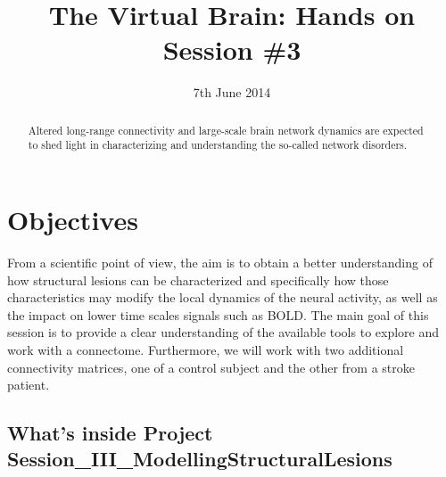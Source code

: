 \documentclass{tufte-handout}
\title{The Virtual Brain: Hands on Session \#3}
\date{7th June 2014}
\begin{document}

\newpage
\ClearWallPaper
\begin{abstract}
\noindent  Altered long-range connectivity and large-scale brain network dynamics are expected to shed light in characterizing and understanding the so-called network disorders. 
\begin{marginfigure}%
  \label{fig:marginfig}
\end{marginfigure}
\end{abstract}


\section{Objectives}\label{sec:objectives}

From a scientific point of view, the aim is to obtain a better understanding of
how structural lesions can be characterized and specifically how those
characteristics may modify the local dynamics of the neural activity, as well
as the impact on lower time scales signals such as BOLD. The main goal of this
session is to provide a clear understanding of the available tools to explore
and work with a connectome. Furthermore, we will work with two additional
connectivity matrices, one of a control subject and the other from a stroke
patient.


\subsection{What's inside Project Session\_III\_ModellingStructuralLesions}\label{sec:project_data}
\end{document}
